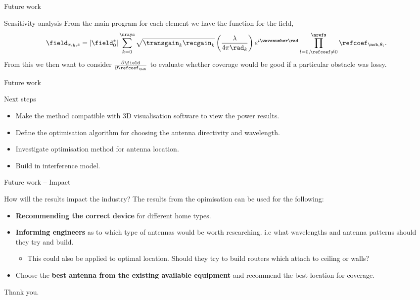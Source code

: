 \documentclass[8pt]{beamer}
\begin{document}
\begin{frame}{Future work}
\begin{block}{Sensitivity analysis}
From the main program for each element we have the function for the field,
\begin{equation}
\field_{x,y,z}=|\field_0^*|\sum_{k=0}^{\nrays}\sqrt{\transgain_{k} \recgain_{k}}\left(\frac{\lambda}{4\pi \rad_{k}}\right)e^{i \wavenumber \rad}\prod_{l=0,\refcoef\neq0}^{\nrefs}\refcoef_{\nob,\theta_i}.
\end{equation}
From this we then want to consider $\frac{\partial \field}{\partial \refcoef_{\nob}}$ to evaluate whether coverage would be good if a particular obstacle was lossy.
\end{block}
\end{frame}
\begin{frame}{Future work}
\begin{block}{Next steps}
\begin{itemize}
\item Make the method compatible with 3D visualisation software to view the power results.
\item Define the optimisation algorithm for choosing the antenna directivity and wavelength.
\item Investigate optimisation method for antenna location.
\item Build in interference model.
\end{itemize}
\end{block}
\end{frame}
\begin{frame}{Future work -- Impact}
\begin{block}{How will the results impact the industry?}
The results from the opimisation can be used for the following:
\begin{itemize}
\item \textbf{Recommending the correct device} for different home types.
\item \textbf{Informing engineers} as to which type of antennas would be worth researching. i.e what wavelengths and antenna patterns should they try and build.
\begin{itemize}
\item This could also be applied to optimal location. Should they try to build routers which attach to ceiling or walls?
\end{itemize}
\item Choose the \textbf{best antenna from the existing available equipment} and recommend the best location for coverage.
\end{itemize}
\end{block}
\pause
\begin{block}{}
Thank you.
\end{block}
\end{frame}
\end{document}
